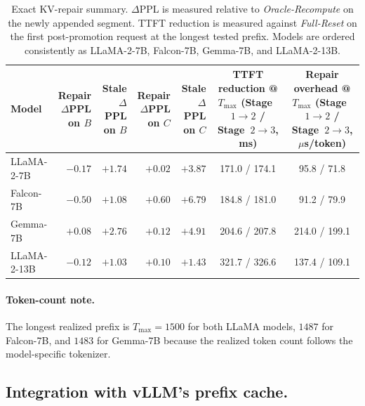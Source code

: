 \documentclass[sigplan,anonymous,review,nonacm]{acmart}
\begin{document}
\begin{table}[t]
\centering
\small
\setlength{\tabcolsep}{4pt}
\renewcommand{\arraystretch}{0.95}
\caption{
Exact KV-repair summary. \(\Delta\)PPL is measured relative to \textit{Oracle-Recompute} on the newly appended segment. TTFT reduction is measured against \textit{Full-Reset} on the first post-promotion request at the longest tested prefix. Models are ordered consistently as LLaMA-2-7B, Falcon-7B, Gemma-7B, and LLaMA-2-13B.
}
\label{tab:kv-repair-summary-appendix}
\begin{tabular}{lrrrrcc}
\toprule
Model
& \makecell{Repair\\\(\Delta\)PPL on \(B\)}
& \makecell{Stale\\\(\Delta\)PPL on \(B\)}
& \makecell{Repair\\\(\Delta\)PPL on \(C\)}
& \makecell{Stale\\\(\Delta\)PPL on \(C\)}
& \makecell{TTFT reduction @ \(T_{\max}\)\\(Stage~\(1\!\rightarrow\!2\) / Stage~\(2\!\rightarrow\!3\), ms)}
& \makecell{Repair overhead @ \(T_{\max}\)\\(Stage~\(1\!\rightarrow\!2\) / Stage~\(2\!\rightarrow\!3\), \(\mu\)s/token)} \\
\midrule
LLaMA-2-7B
& \(-0.17\)
& \(+1.74\)
& \(+0.02\)
& \(+3.87\)
& 171.0 / 174.1
& 95.8 / 71.8 \\
Falcon-7B
& \(-0.50\)
& \(+1.08\)
& \(+0.60\)
& \(+6.79\)
& 184.8 / 181.0
& 91.2 / 79.9 \\
Gemma-7B
& \(+0.08\)
& \(+2.76\)
& \(+0.12\)
& \(+4.91\)
& 204.6 / 207.8
& 214.0 / 199.1 \\
LLaMA-2-13B
& \(-0.12\)
& \(+1.03\)
& \(+0.10\)
& \(+1.43\)
& 321.7 / 326.6
& 137.4 / 109.1 \\
\bottomrule
\end{tabular}
\end{table}

\paragraph{Token-count note.}
The longest realized prefix is \(T_{\max}{=}1500\) for both LLaMA models, \(1487\) for Falcon-7B, and \(1483\) for Gemma-7B because the realized token count follows the model-specific tokenizer.

\subsection{Integration with vLLM's prefix cache.}
\label{app:vllm-prefix-cache}
\end{document}
